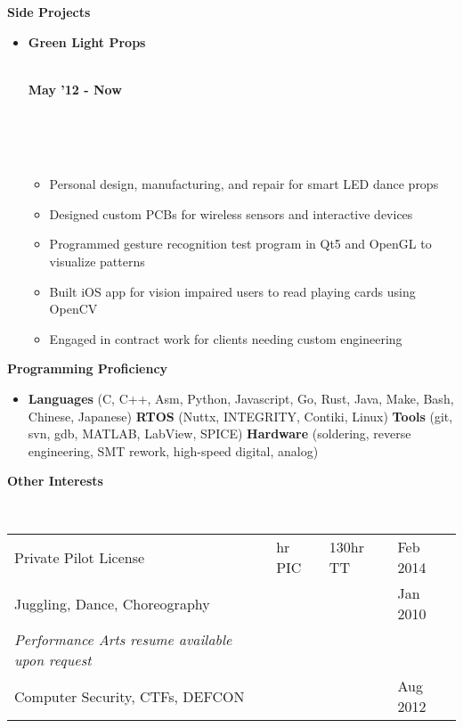 \documentclass[a4paper,11pt]{article}
\newcommand{\isep}{0 pt}
\newcommand{\resheading}[1]{{\small \colorbox{mygrey}{\begin{minipage}{0.975\textwidth}{\textbf{#1 \vphantom{p\^{E}}}}\end{minipage}}}}
\newcommand{\workexp}[4]{
\begin{minipage}[t]{7cm}
\begin{flushleft}
\textbf{#1} \\
\indent \emph{#2}\\
\end{flushleft}
\end{minipage}
\hfill
\begin{minipage}[t]{7cm}
\begin{flushright}
\textbf{#3} \\
\indent #4 \\
\end{flushright}
\end{minipage}
\\[-0.10in]
}
\begin{document}

\resheading{\textbf{Side Projects}}

\begin{itemize}
\item \workexp{Green Light Props}{}{May '12 - Now}{}
\\[-0.3in]
	\begin{itemize} \itemsep \isep
	\item Personal design, manufacturing, and repair for smart LED dance props
	\item Designed custom PCBs for wireless sensors and interactive devices
	\item Programmed gesture recognition test program in Qt5 and OpenGL to visualize patterns
	\item Built iOS app for vision impaired users to read playing cards using OpenCV
	\item Engaged in contract work for clients needing custom engineering
	\end{itemize}
\end{itemize}



\resheading{\textbf{Programming Proficiency} }
\begin{itemize}
\item \noindent \textbf{Languages} (C, C++, Asm, Python, Javascript, Go, Rust, Java, Make, Bash, Chinese, Japanese)
\textbf{RTOS} (Nuttx, INTEGRITY, Contiki, Linux) 
\textbf{Tools} (git, svn, gdb, MATLAB, LabView, SPICE) 
\textbf{Hardware} (soldering, reverse engineering, SMT rework, high-speed digital, analog)
\end{itemize} 



\resheading{\textbf{Other Interests} }
\\[9pt]
\indent \begin{tabular}{   l  l  l  l } 
\indent Private Pilot License & \indent 40 hr PIC & \indent 130hr TT  \indent & \indent Feb 2014\\
\indent Juggling, Dance, Choreography \indent \indent \indent & \indent    & \indent  & \indent Jan 2010 \\
\indent \indent \textit{Performance Arts resume available upon request}  \\
\indent Computer Security, CTFs, DEFCON & \indent  & \indent  & \indent Aug 2012\\
\end{tabular}

\end{document}
